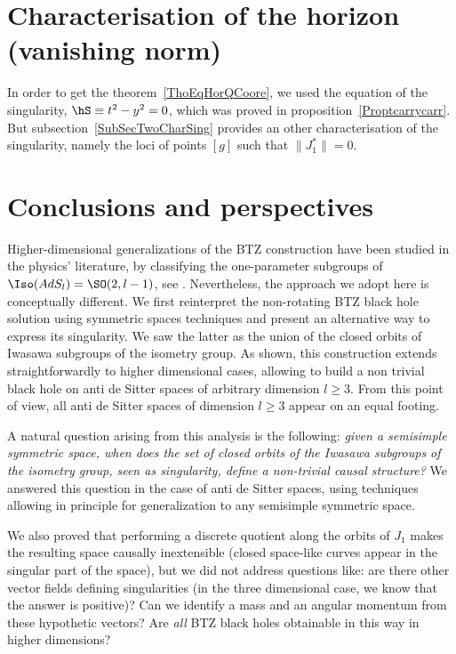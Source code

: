 	\section{Characterisation of the horizon (vanishing norm)}
	\label{SecVanNormChar}

	In order to get the theorem~\ref{ThoEqHorQCoore}, we used the equation of the singularity, $\hS\equiv t^2-y^2=0$, which was proved in proposition~\ref{Proptcarrycarr}. But subsection~\ref{SubSecTwoCharSing} provides an other characterisation of the singularity, namely the loci of points $[g]$ such that $\| J_1^* \|=0$.

	\section{Conclusions and perspectives}		\label{SecConcPerspAd}

	Higher-dimensional generalizations of the BTZ construction have been studied in the physics' literature, by classifying the one-parameter subgroups of $\Iso(AdS_l)=\SO(2,l-1)$, see \cite{Figueroa,AdSBH,Madden,BanadosIQxXuEh,Aminneborg,HolstPeldan}.  Nevertheless, the approach we adopt here is conceptually different. We first reinterpret the non-rotating BTZ black hole solution using symmetric spaces techniques and present an alternative way to express its singularity.  We saw the latter as the union of the closed orbits of Iwasawa subgroups of the isometry group.  As shown, this construction extends straightforwardly to higher dimensional cases, allowing to build a non trivial black hole on anti de Sitter spaces of arbitrary dimension $l\geq 3$.  From this point of view, all anti de Sitter spaces of dimension $l\geq 3$ appear on an equal footing.

	A natural question arising from this analysis is the following: \emph{given a semisimple symmetric space, when does the set of closed orbits of the Iwasawa subgroups of the isometry group, seen as singularity, define a non-trivial causal structure?} We answered this question in the case of anti de Sitter spaces, using techniques allowing in principle for generalization to any semisimple symmetric space.

	We also proved that performing a discrete quotient along the orbits of $J_1$ makes the resulting space causally inextensible (closed space-like curves appear in the singular part of the space), but we did not address  questions like: are there other vector fields defining singularities (in the three dimensional case, we know that the answer is positive)? Can we identify a mass and an angular momentum from these hypothetic vectors? Are \emph{all} BTZ black holes obtainable in this way in higher dimensions?
